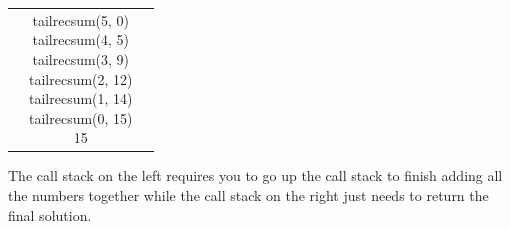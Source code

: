 \documentclass[9pt]{extarticle} %
\begin{document}
\begin{minipage}[t]{.66\linewidth}
\begin{tabular}{ l c r }
&
\makecell{
tailrecsum(5, 0) \\
tailrecsum(4, 5) \\
tailrecsum(3, 9) \\
tailrecsum(2, 12) \\
tailrecsum(1, 14) \\
tailrecsum(0, 15) \\
15 \\}
\end{tabular}

The call stack on the left requires you to go up the call stack to finish
adding all the numbers together while the call stack on the right just
needs to return the final solution.


\hypertarget{secondnews}{} 

\hypertarget{thirdnews}{} 


\end{minipage} %
\end{document}
